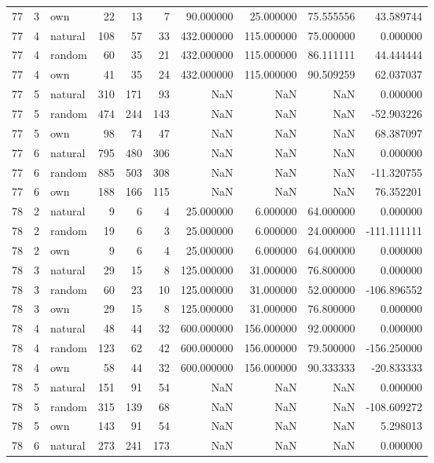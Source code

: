 \begin{table}[htbp]
\begin{tabular}{rrlrrrrrrr}
77 & 3 & own & 22 & 13 & 7 & 90.000000 & 25.000000 & 75.555556 & 43.589744 \\
77 & 4 & natural & 108 & 57 & 33 & 432.000000 & 115.000000 & 75.000000 & 0.000000 \\
77 & 4 & random & 60 & 35 & 21 & 432.000000 & 115.000000 & 86.111111 & 44.444444 \\
77 & 4 & own & 41 & 35 & 24 & 432.000000 & 115.000000 & 90.509259 & 62.037037 \\
77 & 5 & natural & 310 & 171 & 93 & NaN & NaN & NaN & 0.000000 \\
77 & 5 & random & 474 & 244 & 143 & NaN & NaN & NaN & -52.903226 \\
77 & 5 & own & 98 & 74 & 47 & NaN & NaN & NaN & 68.387097 \\
77 & 6 & natural & 795 & 480 & 306 & NaN & NaN & NaN & 0.000000 \\
77 & 6 & random & 885 & 503 & 308 & NaN & NaN & NaN & -11.320755 \\
77 & 6 & own & 188 & 166 & 115 & NaN & NaN & NaN & 76.352201 \\
78 & 2 & natural & 9 & 6 & 4 & 25.000000 & 6.000000 & 64.000000 & 0.000000 \\
78 & 2 & random & 19 & 6 & 3 & 25.000000 & 6.000000 & 24.000000 & -111.111111 \\
78 & 2 & own & 9 & 6 & 4 & 25.000000 & 6.000000 & 64.000000 & 0.000000 \\
78 & 3 & natural & 29 & 15 & 8 & 125.000000 & 31.000000 & 76.800000 & 0.000000 \\
78 & 3 & random & 60 & 23 & 10 & 125.000000 & 31.000000 & 52.000000 & -106.896552 \\
78 & 3 & own & 29 & 15 & 8 & 125.000000 & 31.000000 & 76.800000 & 0.000000 \\
78 & 4 & natural & 48 & 44 & 32 & 600.000000 & 156.000000 & 92.000000 & 0.000000 \\
78 & 4 & random & 123 & 62 & 42 & 600.000000 & 156.000000 & 79.500000 & -156.250000 \\
78 & 4 & own & 58 & 44 & 32 & 600.000000 & 156.000000 & 90.333333 & -20.833333 \\
78 & 5 & natural & 151 & 91 & 54 & NaN & NaN & NaN & 0.000000 \\
78 & 5 & random & 315 & 139 & 68 & NaN & NaN & NaN & -108.609272 \\
78 & 5 & own & 143 & 91 & 54 & NaN & NaN & NaN & 5.298013 \\
78 & 6 & natural & 273 & 241 & 173 & NaN & NaN & NaN & 0.000000 \\

\end{tabular}
\end{table}
